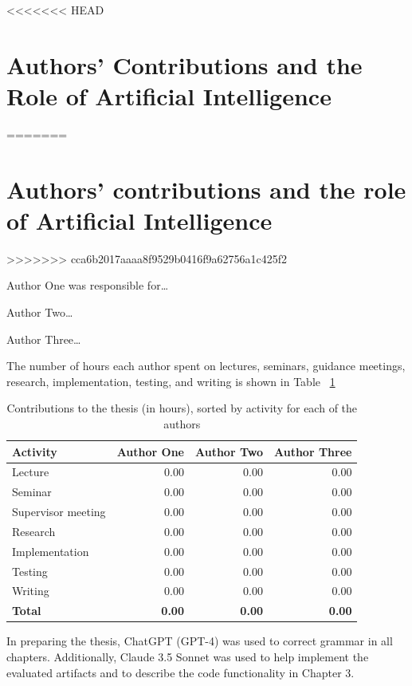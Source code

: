 <<<<<<< HEAD
\section{Authors' Contributions and the Role of Artificial Intelligence}
=======
\section{Authors' contributions and the role of Artificial Intelligence}
>>>>>>> cca6b2017aaaa8f9529b0416f9a62756a1c425f2
\label{sec:introduction}

Author One was responsible for\ldots

Author Two\ldots

Author Three\ldots

The number of hours each author spent on lectures, seminars, guidance
meetings, research, implementation, testing, and writing is shown in
Table ~\ref{tab:combined_hours}

\begin{table}[h]
\caption{Contributions to the thesis (in hours), sorted by activity for each of the authors}
\centering
\renewcommand{\arraystretch}{1.2}
\begin{tabular}{|l|r|r|r|}
\hline
\textbf{Activity} & \textbf{Author One} & \textbf{Author Two} & \textbf{Author Three} \\
\hline
Lecture & 0.00 & 0.00 & 0.00 \\
Seminar & 0.00 & 0.00 & 0.00 \\
Supervisor meeting & 0.00 & 0.00 & 0.00 \\
Research & 0.00 & 0.00 & 0.00 \\
Implementation & 0.00 & 0.00 & 0.00 \\
Testing & 0.00 & 0.00 & 0.00 \\
Writing & 0.00 & 0.00 & 0.00 \\
\hline
\textbf{Total} & \textbf{0.00} & \textbf{0.00} & \textbf{0.00} \\
\hline
\end{tabular}
\label{tab:combined_hours}
\end{table}

In preparing the thesis, ChatGPT (GPT-4) was used to correct grammar
in all chapters. Additionally, Claude 3.5 Sonnet was used to help
implement the evaluated artifacts and to describe the code
functionality in Chapter 3.

